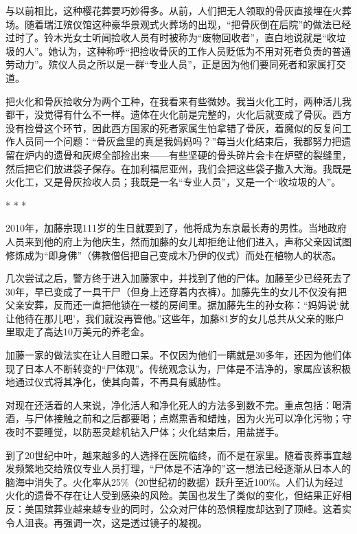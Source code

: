 \documentclass[12pt,oneside]{book}
\begin{document}
与以前相比，这种樱花葬要巧妙得多。从前，人们把无人领取的骨灰直接埋在火葬场。随着瑞江殡仪馆这种豪华景观式火葬场的出现，“把骨灰倒在后院”的做法已经过时了。铃木光女士听闻捡收人员有时被称为“废物回收者”，直白地说就是“收垃圾的人”。她认为，这种称呼“把捡收骨灰的工作人员贬低为不用对死者负责的普通劳动力”。殡仪人员之所以是一群“专业人员”，正是因为他们要同死者和家属打交道。

把火化和骨灰捡收分为两个工种，在我看来有些微妙。我当火化工时，两种活儿我都干，没觉得有什么不一样。遗体在火化前是完整的，火化后就变成了骨灰。西方没有捡骨这个环节，因此西方国家的死者家属生怕拿错了骨灰，着魔似的反复问工作人员同一个问题：“骨灰盒里的真是我妈妈吗？”每当火化结束后，我都努力把遗留在炉内的遗骨和灰烬全部捡出来——有些坚硬的骨头碎片会卡在炉壁的裂缝里，然后把它们放进袋子保存。在加利福尼亚州，我们会把这些袋子撒入大海。我既是火化工，又是骨灰捡收人员；我既是一名“专业人员”，又是一个“收垃圾的人”。

\begin{center}
* * *
\end{center}

2010年，加藤宗现111岁的生日就要到了，他将成为东京最长寿的男性。当地政府人员来到他的府上为他庆生，然而加藤的女儿却拒绝让他们进入，声称父亲因试图修炼成为“即身佛”（佛教僧侣把自己变成木乃伊的仪式）而处在植物人的状态。

几次尝试之后，警方终于进入加藤家中，并找到了他的尸体。加藤至少已经死去了30年，早已变成了一具干尸（但身上还穿着内衣裤）。加藤先生的女儿不仅没有把父亲安葬，反而还一直把他锁在一楼的房间里。据加藤先生的孙女称：“妈妈说‘就让他待在那儿吧’，我们就没再管他。”这些年，加藤81岁的女儿总共从父亲的账户里取走了高达10万美元的养老金。

加藤一家的做法实在让人目瞪口呆。不仅因为他们一瞒就是30多年，还因为他们体现了日本人不断转变的“尸体观”。传统观念认为，尸体是不洁净的，家属应该积极地通过仪式将其净化，使其向善，不再具有威胁性。

对现在还活着的人来说，净化活人和净化死人的方法多到数不完。重点包括：喝清酒，与尸体接触之前和之后都要喝；点燃熏香和蜡烛，因为火光可以净化污物；守夜时不要睡觉，以防恶灵趁机钻入尸体；火化结束后，用盐搓手。

到了20世纪中叶，越来越多的人选择在医院临终，而不是在家里。随着丧葬事宜越发频繁地交给殡仪专业人员打理，“尸体是不洁净的”这一想法已经逐渐从日本人的脑海中消失了。火化率从25\%（20世纪初的数据）跃升至近100\%。人们认为经过火化的遗骨不存在让人受到感染的风险。美国也发生了类似的变化，但结果正好相反：美国殡葬业越来越专业的同时，公众对尸体的恐惧程度却达到了顶峰。这着实令人沮丧。再强调一次，这是透过镜子的凝视。
\end{document}
